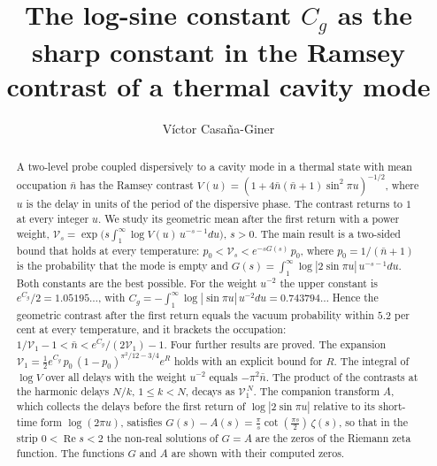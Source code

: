 \documentclass[11pt,reqno]{amsart}
\numberwithin{equation}{section}
\theoremstyle{plain}
\theoremstyle{definition}
\theoremstyle{remark}
\begin{document}
\title[The constant $C_g$ and the contrast of a thermal mode]{The log-sine constant $C_g$ as the sharp constant in the Ramsey contrast of a thermal cavity mode}
\author{V\'ictor Casa\~na-Giner}
\date{}

\begin{abstract}
A two-level probe coupled dispersively to a cavity mode in a thermal state with mean occupation $\bar n$ has the Ramsey contrast $V(u)=(1+4\bar n(\bar n+1)\sin^2\pi u)^{-1/2}$, where $u$ is the delay in units of the period of the dispersive phase. The contrast returns to $1$ at every integer $u$. We study its geometric mean after the first return with a power weight, $\mathcal V_s=\exp\big(s\int_1^\infty\log V(u)\,u^{-s-1}du\big)$, $s>0$. The main result is a two-sided bound that holds at every temperature: $p_0<\mathcal V_s<e^{-sG(s)}\,p_0$, where $p_0=1/(\bar n+1)$ is the probability that the mode is empty and $G(s)=\int_1^\infty\log|2\sin\pi u|\,u^{-s-1}du$. Both constants are the best possible. For the weight $u^{-2}$ the upper constant is $e^{C_g}/2=1.05195\ldots$, with $C_g=-\int_1^\infty\log|\sin\pi u|\,u^{-2}du=0.743794\ldots$ Hence the geometric contrast after the first return equals the vacuum probability within $5.2$ per cent at every temperature, and it brackets the occupation: $1/\mathcal V_1-1<\bar n<e^{C_g}/(2\mathcal V_1)-1$. Four further results are proved. The expansion $\mathcal V_1=\tfrac12e^{C_g}\,p_0\,(1-p_0)^{\pi^2/12-3/4}e^{R}$ holds with an explicit bound for $R$. The integral of $\log V$ over all delays with the weight $u^{-2}$ equals $-\pi^2\bar n$. The product of the contrasts at the harmonic delays $N/k$, $1\le k<N$, decays as $\mathcal V_1^{\,N}$. The companion transform $A$, which collects the delays before the first return of $\log|2\sin\pi u|$ relative to its short-time form $\log(2\pi u)$, satisfies $G(s)-A(s)=\frac\pi s\cot(\frac{\pi s}2)\,\zeta(s)$, so that in the strip $0<\operatorname{Re}s<2$ the non-real solutions of $G=A$ are the zeros of the Riemann zeta function. The functions $G$ and $A$ are shown with their computed zeros.
\end{abstract}


\maketitle
\tableofcontents
\end{document}
